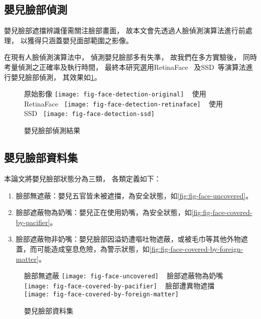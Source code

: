 \documentclass[class=NCU_thesis, crop=false]{standalone}
\begin{document}
\subsection{嬰兒臉部偵測}
嬰兒臉部遮擋辨識僅需關注臉部畫面，
故本文會先透過人臉偵測演算法進行前處理，
以獲得只涵蓋嬰兒面部範圍之影像。

在現有人臉偵測演算法中，
偵測嬰兒臉部多有失準，
故我們在多方實驗後，
同時考量偵測之正確率及執行時間，
最終本研究選用RetinaFace~\cite{deng_retinaface_2020}
及SSD~\cite{ye_face_2021}等演算法進行嬰兒臉部偵測，
其效果如\cref{fig:fig-face-detection}。
\begin{figure}[!hbt]
    \centering
    \subcaptionbox
        {原始影像
        \label{fig:fig-face-detection-original}}
        {\texttt{[image: fig-face-detection-original]}}
    ~
    \subcaptionbox
        {使用RetinaFace~\cite{deng_retinaface_2020}
        \label{fig:fig-face-detection-retinaface}}
        {\texttt{[image: fig-face-detection-retinaface]}}
    ~
    \subcaptionbox
        {使用SSD~\cite{ye_face_2021}
        \label{fig:fig-face-detection-ssd}}
        {\texttt{[image: fig-face-detection-ssd]}}
    \caption{嬰兒臉部偵測結果}
    \label{fig:fig-face-detection}
\end{figure}

\subsection{嬰兒臉部資料集}
本論文將嬰兒臉部狀態分為三類，
各類定義如下：
\begin{enumerate}
    \item 臉部無遮蔽：嬰兒五官皆未被遮擋，為安全狀態，如\cref{fig:fig-face-uncovered}。
    \item 臉部遮蔽物為奶嘴：嬰兒正在使用奶嘴，為安全狀態，如\cref{fig:fig-face-covered-by-pacifier}。
    \item 臉部遮蔽物非奶嘴：嬰兒臉部因溢奶遭嘔吐物遮蔽，或被毛巾等其他外物遮蓋，而可能造成窒息危險，為警示狀態，如\cref{fig:fig-face-covered-by-foreign-matter}。
\end{enumerate}
\begin{figure}[!hbt]
    \centering
    \subcaptionbox
        {臉部無遮蔽
        \label{fig:fig-face-uncovered}}
        {\texttt{[image: fig-face-uncovered]}}
    ~
    \subcaptionbox
        {臉部遮蔽物為奶嘴
        \label{fig:fig-face-covered-by-pacifier}}
        {\texttt{[image: fig-face-covered-by-pacifier]}}
    ~
    \subcaptionbox
        {臉部遭異物遮擋
        \label{fig:fig-face-covered-by-foreign-matter}}
        {\texttt{[image: fig-face-covered-by-foreign-matter]}}
    \caption{嬰兒臉部資料集}
    \label{fig:fig-face-dataset}
\end{figure}
\end{document}
